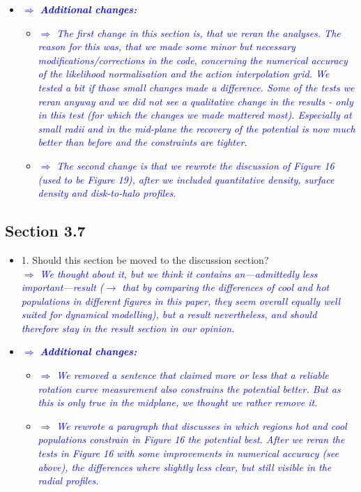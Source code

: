 \documentclass[10pt,a4paper]{article}
\newcommand{\Comment}[1]{\textsl{\textcolor{Blue}{$\Longrightarrow$ {#1}}}}
\begin{document}
\begin{itemize}
\item \Comment{\textbf{Additional changes:}}
\begin{itemize}
\item \Comment{The first change in this section is, that we reran the analyses. The reason for this was, that we made some minor but necessary modifications/corrections in the code, concerning the numerical accuracy of the likelihood normalisation and the action interpolation grid. We tested a bit if those small changes made a difference. Some of the tests we reran anyway and we did not see a qualitative change in the results - only in this test (for which the changes we made mattered most). Especially at small radii and in the mid-plane the recovery of the potential is now much better than before and the constraints are tighter.}
\item \Comment{The second change is that we rewrote the discussion of Figure 16 (used to be Figure 19), after we included quantitative density, surface density and disk-to-halo profiles.}
\end{itemize} 
\end{itemize}

\subsection{Section 3.7}
\begin{itemize}
\item 1. Should this section be moved to the discussion section?
\\\Comment{We thought about it, but we think it contains an---admittedly less important---result ($\longrightarrow$ that by comparing the differences of cool and hot populations in different figures in this paper, they seem overall equally well suited for dynamical modelling), but a result nevertheless, and should therefore stay in the result section in our opinion.}
\item \Comment{\textbf{Additional changes:}} 
\begin{itemize}
\item \Comment{We removed a sentence that claimed more or less that a reliable rotation curve measurement also constrains the potential better. But as this is only true in the midplane, we thought we rather remove it.}
\item \Comment{We rewrote a paragraph that discusses in which regions hot and cool populations constrain in Figure 16 the potential best. After we reran the tests in Figure 16 with some improvements in numerical accuracy (see above), the differences where slightly less clear, but still visible in the radial profiles.}
\end{itemize}
\end{itemize}
\end{document}
